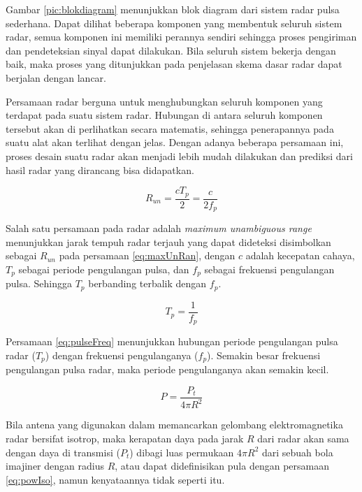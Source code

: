 Gambar \ref{pic:blokdiagram} menunjukkan blok diagram dari sistem radar pulsa sederhana. Dapat dilihat beberapa komponen yang membentuk seluruh sistem radar, semua komponen ini memiliki perannya sendiri sehingga proses pengiriman dan pendeteksian sinyal dapat dilakukan.  Bila seluruh sistem bekerja dengan baik, maka proses yang ditunjukkan pada penjelasan skema dasar radar dapat berjalan dengan lancar.

Persamaan radar berguna untuk menghubungkan seluruh komponen yang terdapat pada suatu sistem radar. Hubungan di antara seluruh komponen tersebut akan di perlihatkan secara matematis, sehingga penerapannya pada suatu alat akan terlihat dengan jelas. Dengan adanya beberapa persamaan ini, proses desain suatu radar akan menjadi lebih mudah dilakukan dan prediksi dari hasil radar yang dirancang bisa didapatkan.

\begin{equation}
	R_{un} = \frac{cT_{p}}{2} = \frac{c}{2f_{p}}
	\label{eq:maxUnRan}
\end{equation}

Salah satu persamaan pada radar adalah \textit{maximum unambiguous range} menunjukkan jarak tempuh radar terjauh yang dapat dideteksi disimbolkan sebagai $R_{un}$ pada persamaan \ref{eq:maxUnRan}, dengan $c$ adalah kecepatan cahaya, $T_{p}$ sebagai periode pengulangan pulsa, dan $f_{p}$ sebagai frekuensi pengulangan pulsa. Sehingga $T_{p}$ berbanding terbalik dengan $f_{p}$.

\begin{equation}
	T_{p} = \frac{1}{f_{p}}
	\label{eq:pulseFreq}
\end{equation}

Persamaan \ref{eq:pulseFreq} menunjukkan hubungan periode pengulangan pulsa radar ($T_{p}$) dengan frekuensi pengulanganya ($f_{p}$). Semakin besar frekuensi pengulangan pulsa radar, maka periode pengulanganya akan semakin kecil.

\begin{equation}
	P = \frac{P_{t}}{4\pi R^{2}}
	\label{eq:powIso}
\end{equation}

Bila antena yang digunakan dalam memancarkan gelombang elektromagnetika radar bersifat isotrop, maka kerapatan daya pada jarak $R$ dari radar akan sama dengan daya di transmisi ($P_{t}$) dibagi luas permukaan $4\pi R^{2}$ dari sebuah bola imajiner dengan radius $R$, atau dapat didefinisikan pula dengan persamaan \ref{eq:powIso}, namun kenyataannya tidak seperti itu.

